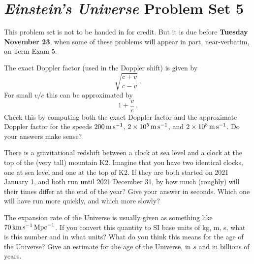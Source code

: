 \documentclass[12pt, letterpaper]{article}
\begin{document}
\section*{\textsl{Einstein's Universe} Problem Set 5}

This problem set is not to be handed in for credit. But it is due
before \textbf{Tuesday November 23}, when some of these problems
will appear in part, near-verbatim, on Term Exam 5.

\begin{problem}
The exact Doppler factor (used in the Doppler shift) is given by
\begin{equation}
\sqrt{\frac{c + v}{c - v}}~.
\end{equation}
For small $v/c$ this can be approximated by
\begin{equation}
1 + \frac{v}{c}~.
\end{equation}
Check this by computing both the exact Doppler factor and the approximate
Doppler factor for
the speeds $200\,\mathrm{m}\,\mathrm{s}^{-1}$, $2\times10^5\,\mathrm{m}\,\mathrm{s}^{-1}$, and $2\times 10^8\,\mathrm{m}\,\mathrm{s}^{-1}$.
Do your answers make sense?
\end{problem}

\begin{problem}
There is a gravitational redshift between a clock at sea level and a clock at the
top of the (very tall) mountain K2.
Imagine that you have two identical clocks, one at sea level and one at the top of K2.
If they are both started on 2021 January 1,
and both run until 2021 December 31, by how much (roughly) will their times differ
at the end of the year? Give your answer in seconds.
Which one will have run more quickly, and which more slowly?
\end{problem}

\begin{problem}
The expansion rate of the Universe is usually given as something like $70\,\mathrm{km}\,\mathrm{s}^{-1}\,\mathrm{Mpc}^{-1}$.
If you convert this quantity to SI base units of kg, m, s, what is this number and in what units?
What do you think this means for the age of the Universe?
Give an estimate for the age of the Universe, in $s$ and in billions of years.
\end{problem}
\end{document}
